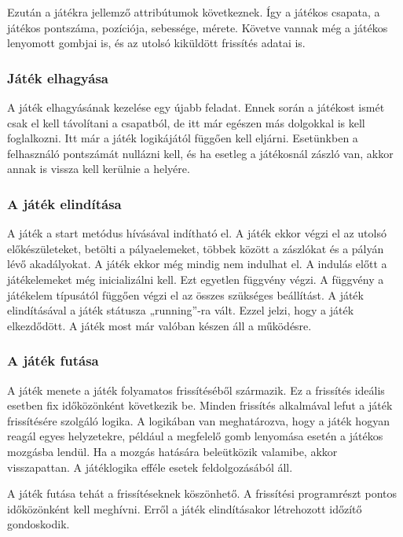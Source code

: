 \documentclass[bibliography=totocnumbered]{article}
\begin{document}
Ezután a játékra jellemző attribútumok következnek. Így a játékos
csapata, a játékos pontszáma, pozíciója, sebessége, mérete. Követve
vannak még a játékos lenyomott gombjai is, és az utolsó kiküldött
frissítés adatai is.


\subsubsection{Játék elhagyása}

A játék elhagyásának kezelése egy újabb feladat. Ennek során a játékost
ismét csak el kell távolítani a csapatból, de itt már egészen más
dolgokkal is kell foglalkozni. Itt már a játék logikájától függően kell
eljárni. Esetünkben a felhasználó pontszámát nullázni kell, és ha
esetleg a játékosnál zászló van, akkor annak is vissza kell kerülnie a
helyére.


\subsubsection{A játék
elindítása}

A játék a start metódus hívásával indítható el. A játék ekkor végzi el
az utolsó előkészületeket, betölti a pályaelemeket, többek között a
zászlókat és a pályán lévő akadályokat. A játék ekkor még mindig nem
indulhat el. A indulás előtt a játékelemeket még inicializálni kell. Ezt
egyetlen függvény végzi. A függvény a játékelem típusától függően végzi
el az összes szükséges beállítást. A játék elindításával a játék
státusza „running''-ra vált. Ezzel jelzi, hogy a játék elkezdődött. A
játék most már valóban készen áll a működésre.


\subsubsection{A játék futása}

A játék menete a játék folyamatos frissítéséből származik. Ez a
frissítés ideális esetben fix időközönként következik be. Minden
frissítés alkalmával lefut a játék frissítésére szolgáló logika. A
logikában van meghatározva, hogy a játék hogyan reagál egyes
helyzetekre, például a megfelelő gomb lenyomása esetén a játékos
mozgásba lendül. Ha a mozgás hatására beleütközik valamibe, akkor
visszapattan. A játéklogika efféle esetek feldolgozásából áll.

A játék futása tehát a frissítéseknek köszönhető. A frissítési
programrészt pontos időközönként kell meghívni. Erről a játék
elindításakor létrehozott időzítő gondoskodik.
\end{document}
